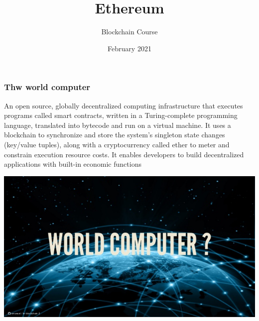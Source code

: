 \documentclass[11pt]{beamer}  %
\subtitle{Blockchain Course}
\title{Ethereum}
\institute{Universit\`a di Verona, Italy}
\date{February 2021}
\begin{document}
\begin{frame}
  \titlepage
\end{frame}

\begin{frame}
  \frametitle{Thw world computer}

  \begin{greenbox}{}
    An open source, globally \alert{decentralized computing infrastructure}
    that executes programs called \alert{smart contracts}, written
    in a \alert{Turing-complete} programming language, translated into
    bytecode and run on a \alert{virtual machine}. It uses a
    \alert{blockchain} to synchronize and store the system's \alert{singleton state} changes
    (key/value tuples), along
    with a cryptocurrency called \alert{ether} to \alert{meter and constrain}
    execution resource costs. It enables developers to build
    \alert{decentralized applications} with \alert{built-in economic functions}
  \end{greenbox}

  \begin{center}
    \includegraphics[scale=0.3,clip=false]{pictures/world-computer.jpg}
  \end{center}

\end{frame}
\end{document}
